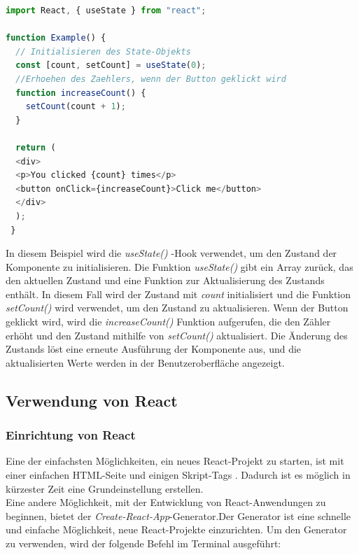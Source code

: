 \begin{lstlisting}[language=JavaScript,
	frame=single,           % Ein Rahmen um den Code
	framexleftmargin=15pt,  % Rahmen link von den Zahlen
	style=algoBericht,
	label={State-Fkt.},
	captionpos=b ,          % Caption unter den Code setzen
	caption={Beispiel State in Reeact}]
import React, { useState } from "react";
	
function Example() {
  // Initialisieren des State-Objekts
  const [count, setCount] = useState(0);
  //Erhoehen des Zaehlers, wenn der Button geklickt wird
  function increaseCount() {
    setCount(count + 1);
  }
	
  return (
  <div>
  <p>You clicked {count} times</p>
  <button onClick={increaseCount}>Click me</button>
  </div>
  );
 }
\end{lstlisting}

In diesem Beispiel wird die \emph{useState()} -Hook verwendet, um den Zustand der Komponente zu initialisieren. Die Funktion \emph{useState()} gibt ein Array zurück, das den aktuellen Zustand und eine Funktion zur Aktualisierung des Zustands enthält. In diesem Fall wird der Zustand mit \emph{count} initialisiert und die Funktion \emph{setCount()} wird verwendet, um den Zustand zu aktualisieren. Wenn der Button geklickt wird, wird die \emph{increaseCount()} Funktion aufgerufen, die den Zähler erhöht und den Zustand mithilfe von \emph{setCount()} aktualisiert. Die Änderung des Zustands löst eine erneute Ausführung der Komponente aus, und die aktualisierten Werte werden in der Benutzeroberfläche angezeigt.


\subsection{Verwendung von React}
\subsubsection{Einrichtung von React}
 Eine der einfachsten Möglichkeiten, ein neues React-Projekt zu starten, ist mit einer einfachen HTML-Seite und einigen Skript-Tags \cite{deLegacyReactjs}. Dadurch ist es möglich in kürzester Zeit eine Grundeinstellung erstellen.\\
 Eine andere Möglichkeit, mit der Entwicklung von React-Anwendungen zu beginnen, bietet der \emph{Create-React-App}-Generator\cite{vsCodeReactTutorial}.Der Generator ist eine schnelle und einfache Möglichkeit, neue React-Projekte einzurichten. Um den Generator zu verwenden, wird der folgende Befehl im Terminal ausgeführt:
 
